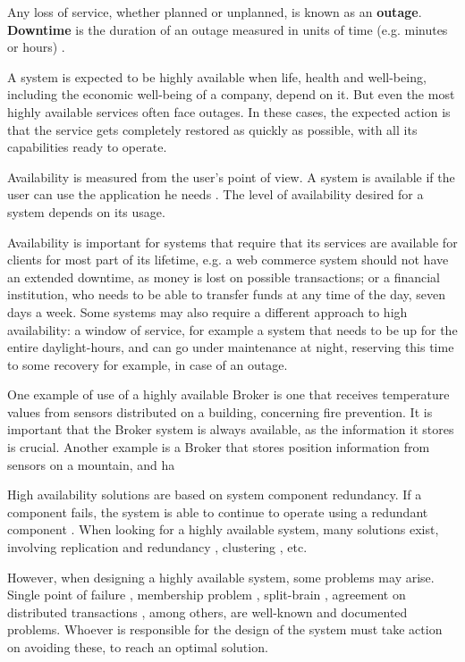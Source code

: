 Any loss of service, whether planned or unplanned, is known as an \textbf{outage}. 
\textbf{Downtime} is the duration of an outage measured in units of time (e.g. minutes or hours) \cite{weygant2001clusters}.

A system is expected to be highly available when life, health and well-being, including the economic well-being of a company, depend on it. But even the most highly available services often face outages. In these cases, the expected action is that the service gets completely restored as quickly as possible, with all its capabilities ready to operate.

Availability is measured from the user's point of view. A system is available if the user can use the application he needs \cite{piedad2008high}. The level of availability desired for a system depends on its usage.

Availability is important for systems that require that its services are available for clients for most part of its lifetime, e.g. a web commerce system should not have an extended downtime, as money is lost on possible transactions; or a financial institution, who needs to be able to transfer funds at any time of the day, seven days a week. Some systems may also require a different approach to high availability: a window of service, for example a system that needs to be up for the entire daylight-hours, and can go under maintenance at night, reserving this time to some recovery for example, in case of an outage.

One example of use of a highly available Broker is one that receives temperature values from sensors distributed on a building, concerning fire prevention. It is important that the Broker system is always available, as the information it stores is crucial. Another example is a Broker that stores position information from sensors on a mountain, and ha

High availability solutions are based on system component redundancy. If a component fails, the system is able to continue to operate using a redundant component \cite{engelmann2005concepts}. When looking for a highly available system, many solutions exist, involving replication and redundancy \cite{oraclereplication}, clustering \cite{oracleclustering}, etc.


However, when designing a highly available system, some problems may arise. Single point of failure \cite{engelmann2005concepts}, membership problem \cite{cristian1991reaching}, split-brain \cite{barreradesign}, agreement on distributed transactions \cite{guerraoui2002non}, among others, are well-known and documented problems. Whoever is responsible for the design of the system must take action on avoiding these, to reach an optimal solution.



